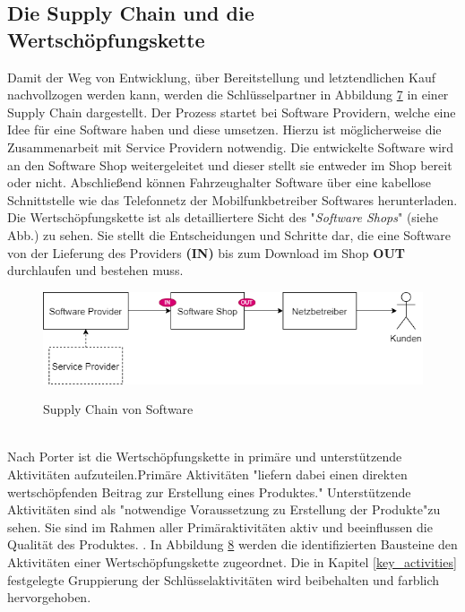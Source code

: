 \subsection{Die Supply Chain und die Wertschöpfungskette}\label{wsk}
Damit der Weg von Entwicklung, über Bereitstellung und letztendlichen Kauf nachvollzogen werden kann, werden die Schlüsselpartner in Abbildung \hyperref[img:supplychain]{7} in einer Supply Chain dargestellt. Der Prozess startet bei Software Providern, welche eine Idee für eine Software haben und diese umsetzen. Hierzu ist möglicherweise die Zusammenarbeit mit Service Providern notwendig. Die entwickelte Software wird an den Software Shop weitergeleitet und dieser stellt sie entweder im Shop bereit oder nicht. Abschließend können Fahrzeughalter Software über eine kabellose Schnittstelle wie das Telefonnetz der Mobilfunkbetreiber Softwares herunterladen. Die Wertschöpfungskette ist als detailliertere Sicht des "\textit{Software Shops}" (siehe Abb.) zu sehen. Sie stellt die Entscheidungen und Schritte dar, die eine Software von der Lieferung des Providers \textbf{(IN)} bis zum Download im Shop \textbf{OUT} durchlaufen und bestehen muss.
\begin{figure}[!h]
	\centering
	\includegraphics[width=0.9\columnwidth]{pictures/konzept-supplychain.png}
	\label{img:supplychain}
	\caption{Supply Chain von Software}
\end{figure}\\
Nach Porter ist die Wertschöpfungskette in primäre und unterstützende Aktivitäten aufzuteilen.\cite{wsk}Primäre Aktivitäten "liefern dabei einen direkten wertschöpfenden Beitrag zur Erstellung eines Produktes."\cite[Vgl.]{wsk} Unterstützende Aktivitäten sind als "notwendige Voraussetzung zu Erstellung der Produkte"\cite[Vgl. ebd.]{wsk}zu sehen. Sie sind im Rahmen aller Primäraktivitäten aktiv und beeinflussen die Qualität des Produktes. \cite{wsk2}. In Abbildung \hyperref[img:wsk]{8} werden die identifizierten Bausteine den Aktivitäten einer Wertschöpfungskette zugeordnet. Die in Kapitel \ref{key_activities} festgelegte Gruppierung der Schlüsselaktivitäten wird beibehalten und farblich hervorgehoben.

